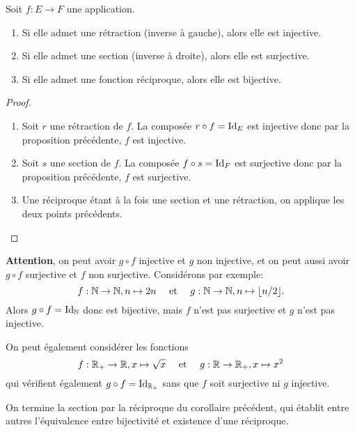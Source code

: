 \begin{corollaire}[de la proposition]\label{bijective-si-reciproque}
Soit $f : E\to F$ une application.
\begin{enumerate}
\item Si elle admet une rétraction (inverse à gauche), alors elle est injective.
\item Si elle admet une section (inverse à droite), alors elle est surjective.
\item Si elle admet une fonction réciproque, alors elle est bijective.
\end{enumerate}
\end{corollaire}
\begin{proof}
\begin{enumerate}
\item Soit $r$ une rétraction de $f$. La composée $r\circ f = \operatorname{Id}_E$ est injective donc par la proposition précédente, $f$ est injective.
\item Soit $s$ une section de $f$. La composée $f \circ s= \operatorname{Id}_F$ est surjective donc par la proposition précédente, $f$ est surjective.
\item Une réciproque étant à la fois une section et une rétraction, on applique les deux points précédents.
\end{enumerate}
\end{proof}


\begin{remarque}
\textbf{Attention}, on peut avoir $g\circ f$ injective et $g$ non injective, et on peut aussi avoir $g\circ f$ surjective et $f$ non surjective. Considérons par exemple:
\[
f : \mathbb{N}\to \mathbb{N}, n\mapsto 2n
\quad \text{ et }\quad
g : \mathbb{N}\to \mathbb{N}, n\mapsto \lfloor n/2\rfloor.
\]
Alors $g\circ f = \operatorname{Id}_{\mathbb{N}}$ donc est bijective, mais $f$ n'est pas surjective et $g$ n'est pas injective.

On peut également considérer les fonctions
\[
f : \mathbb{R}_+\to \mathbb{R}, x\mapsto \sqrt x
\quad \text{ et }\quad
g : \mathbb{R}\to \mathbb{R}_+, x\mapsto x^2
\]
qui vérifient également $g\circ f=\operatorname{Id}_{\mathbb{R}_+}$ sans que $f$ soit surjective ni $g$ injective.
\end{remarque}



On termine la section par la réciproque du corollaire précédent, qui établit entre autres l'équivalence entre bijectivité et existence d'une réciproque.

